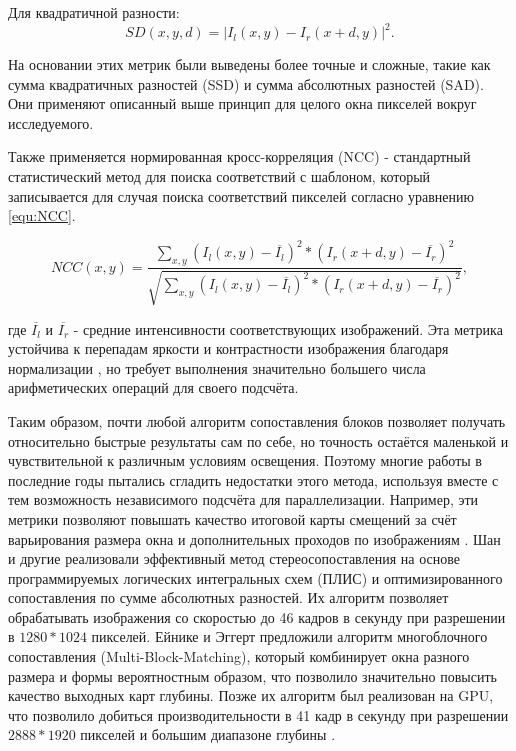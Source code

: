 Для квадратичной разности: 
\begin{equation}
	SD(x, y, d) = |I_l(x,y) - I_r(x+d, y)|^2.		
	\label{eq:SD}
\end{equation}

На основании этих метрик были выведены более точные и сложные, такие как сумма квадратичных разностей (SSD) и сумма абсолютных разностей (SAD). Они применяют описанный выше принцип для целого 
окна пикселей вокруг исследуемого.

Также применяется нормированная кросс-корреляция (NCC) - стандартный статистический метод для поиска соответствий с шаблоном, который записывается для случая поиска соответствий пикселей 
согласно уравнению \ref{equ:NCC}.

\begin{equation}
	NCC(x, y) = \frac{ \sum_{x, y}^{} (I_l(x, y) - \overline{I_l} )^2 * ( I_r(x + d, y) - \overline{I_r} )^2   }{ \sqrt{ \sum_{x, y}^{} (I_l(x, y) - \overline{I_l} )^2 * ( I_r(x + d, y) - \overline{I_r} )^2 }  }, 
	\label{equ:NCC}
\end{equation}

где $\overline{I_l}$ и $\overline{I_r}$ - средние интенсивности соответствующих изображений. Эта метрика устойчива к перепадам яркости и контрастности изображения благодаря нормализации \cite{ncceval}, 
но требует выполнения значительно большего числа арифметических операций для своего подсчёта. 

Таким образом, почти любой алгоритм сопоставления блоков позволяет получать относительно быстрые результаты сам по себе, но точность остаётся маленькой и чувствительной к различным условиям освещения. Поэтому многие 
работы в последние годы пытались сгладить недостатки этого метода, используя вместе с тем возможность независимого  подсчёта для параллелизации.    
Например, эти метрики позволяют повышать качество итоговой карты смещений за счёт варьирования размера окна и дополнительных проходов по изображениям \cite{twosizewindow}. 
Шан и другие \cite{SAD_FPGA} реализовали эффективный метод стереосопоставления на основе программируемых логических интегральных схем (ПЛИС) и оптимизированного сопоставления по сумме абсолютных разностей. 
Их алгоритм позволяет обрабатывать изображения со скоростью до 46 кадров в секунду при разрешении в $1280*1024$ пикселей. Ейнике и Эггерт \cite{multiblock} предложили алгоритм многоблочного сопоставления (Multi-Block-Matching), который комбинирует окна разного размера и формы вероятностным образом, что позволило значительно 
повысить качество выходных карт глубины. Позже их алгоритм был реализован на GPU, что позволило добиться производительности в 41 кадр в секунду при разрешении $2888*1920$ пикселей и 
большим диапазоне глубины \cite{multiblock_gpu}. 

